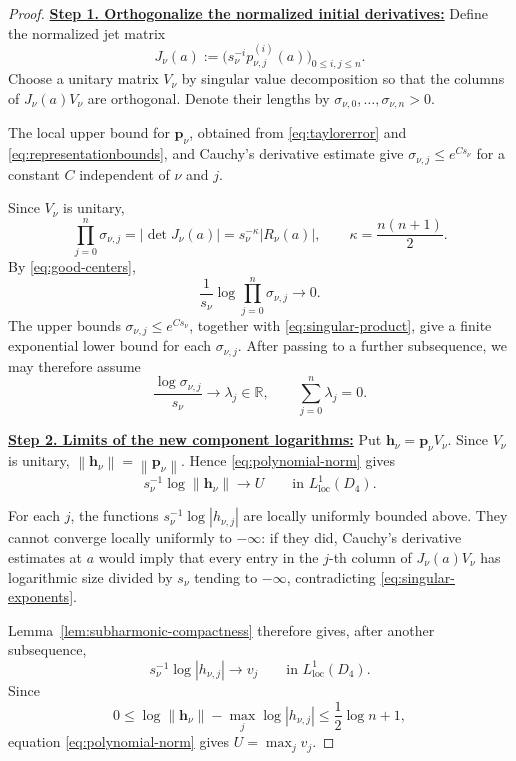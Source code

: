 \documentclass[12pt,letterpaper,reqno]{amsart}
\theoremstyle{definition}
\numberwithin{equation}{section}
\newcommand{\R}{\mathbb R}
\newcommand{\loc}{\mathrm{loc}}
\newcommand{\norm}[1]{\left\lVert#1\right\rVert}
\newcommand{\pv}{\bm p}
\newcommand{\hv}{\bm h}
\begin{document}
\begin{proof}

\medskip\noindent
\textbf{\underline{Step 1. Orthogonalize the normalized initial derivatives:}}
Define the normalized jet matrix
\[
J_\nu(a)
:=
\bigl(
s_\nu^{-i}p_{\nu,j}^{(i)}(a)
\bigr)_{0\leq i,j\leq n}.
\]
Choose a unitary matrix \(V_\nu\) by singular value decomposition so
that the columns of \(J_\nu(a)V_\nu\) are orthogonal. Denote their
lengths by
\(\sigma_{\nu,0},\ldots,\sigma_{\nu,n}>0\).

The local upper bound for \(\pv_\nu\), obtained from
\eqref{eq:taylorerror} and \eqref{eq:representationbounds}, and
Cauchy's derivative estimate give
\(\sigma_{\nu,j}\leq e^{Cs_\nu}\) for a constant \(C\) independent of
\(\nu\) and \(j\).

Since \(V_\nu\) is unitary,
\[
\prod_{j=0}^{n}\sigma_{\nu,j}
=
|\det J_\nu(a)|
=
s_\nu^{-\kappa}|R_\nu(a)|,
\qquad
\kappa=\frac{n(n+1)}2.
\]
By \eqref{eq:good-centers},
\begin{equation}\label{eq:singular-product}
 \frac1{s_\nu}
 \log
 \prod_{j=0}^{n}\sigma_{\nu,j}
 \longrightarrow0.
\end{equation}
The upper bounds
\(\sigma_{\nu,j}\leq e^{Cs_\nu}\), together with
\eqref{eq:singular-product}, give a finite exponential lower bound for
each \(\sigma_{\nu,j}\). After passing to a further subsequence, we may
therefore assume
\begin{equation}\label{eq:singular-exponents}
 \frac{\log\sigma_{\nu,j}}{s_\nu}
 \longrightarrow
 \lambda_j\in\R,
 \qquad
 \sum_{j=0}^{n}\lambda_j=0.
\end{equation}


\medskip\noindent
\textbf{\underline{Step 2. Limits of the new component logarithms:}}
Put \(\hv_\nu=\pv_\nu V_\nu\).
Since \(V_\nu\) is unitary,
\(\norm{\hv_\nu}=\norm{\pv_\nu}\). Hence
\eqref{eq:polynomial-norm} gives
\[
s_\nu^{-1}\log\norm{\hv_\nu}
\longrightarrow U
\qquad\text{in }L^1_{\loc}(D_4).
\]

For each \(j\), the functions
\(s_\nu^{-1}\log|h_{\nu,j}|\) are locally uniformly bounded above.
They cannot converge locally uniformly to \(-\infty\): if they did,
Cauchy's derivative estimates at \(a\) would imply that every entry in
the \(j\)-th column of \(J_\nu(a)V_\nu\) has logarithmic size divided
by \(s_\nu\) tending to \(-\infty\), contradicting
\eqref{eq:singular-exponents}.

Lemma~\ref{lem:subharmonic-compactness} therefore gives, after another
subsequence,
\[
s_\nu^{-1}\log|h_{\nu,j}|
\longrightarrow v_j
\qquad\text{in }L^1_{\loc}(D_4).
\]
Since
\[
0\leq
\log\norm{\hv_\nu}
-
\max_j\log|h_{\nu,j}|
\leq
\frac12\log {n+1},
\]
equation \eqref{eq:polynomial-norm} gives
\(U=\max_jv_j\).


\end{proof}
\end{document}
